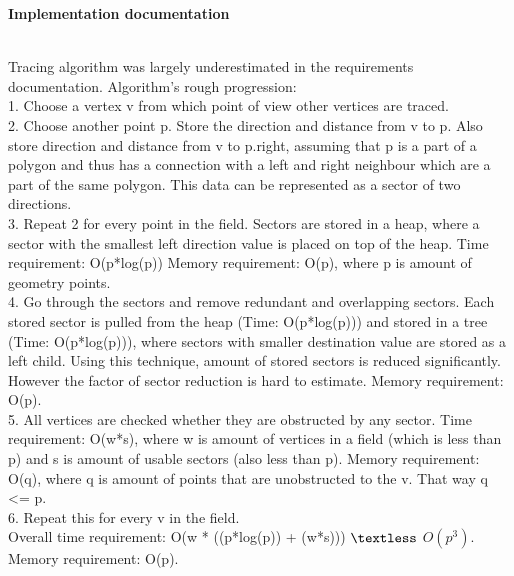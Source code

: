 \documentclass[a4paper,12pt]{article}
\begin{document}
\centerline{\huge \textbf{Implementation documentation}} \hspace*{\fill}
\\
Tracing algorithm was largely underestimated in the requirements documentation. Algorithm's rough progression: \\
1. Choose a vertex v from which point of view other vertices are traced.\\
2. Choose another point p. Store the direction and distance from v to p. Also store direction and distance from v to p.right, assuming that p is a part of a polygon and thus has a connection with a left and right neighbour which are a part of the same polygon. This data can be represented as a sector of two directions.\\
3. Repeat 2 for every point in the field. Sectors are stored in a heap, where a sector with the smallest left direction value is placed on top of the heap. Time requirement: O(p*log(p)) Memory requirement: O(p), where p is amount of geometry points.\\
4. Go through the sectors and remove redundant and overlapping sectors. Each stored sector is pulled from the heap (Time: O(p*log(p))) and stored in a tree (Time: O(p*log(p))), where sectors with smaller destination value are stored as a left child. Using this technique, amount of stored sectors is reduced significantly. However the factor of sector reduction is hard to estimate. Memory requirement: O(p).\\
5. All vertices are checked whether they are obstructed by any sector. Time requirement: O(w*s), where w is amount of vertices in a field (which is less than p) and s is amount of usable sectors (also less than p). Memory requirement: O(q), where q is amount of points that are unobstructed to the v. That way q \textless = p.\\
6. Repeat this for every v in the field.\\
Overall time requirement: O(w * ((p*log(p)) + (w*s))) $\textless$ $O(p^3)$. Memory requirement: O(p).
\end{document}
